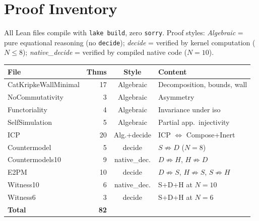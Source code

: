 \documentclass[sigconf,screen,review,anonymous]{acmart}
\begin{document}
\section{Proof Inventory}
\label{app:inventory}

All Lean files compile with \texttt{lake build}, zero \texttt{sorry}. Proof styles: \emph{Algebraic} = pure equational reasoning (no \texttt{decide}); \emph{decide} = verified by kernel computation ($N \leq 8$); \emph{native\_decide} = verified by compiled native code ($N = 10$).

\medskip
{\small
\begin{tabular}{lrcl}
\textbf{File} & \textbf{Thms} & \textbf{Style} & \textbf{Content} \\
\hline
CatKripkeWallMinimal & 17 & Algebraic & Decomposition, bounds, wall \\
NoCommutativity      &  3 & Algebraic & Asymmetry \\
Functoriality        &  4 & Algebraic & Invariance under iso \\
SelfSimulation       &  5 & Algebraic & Partial app.\ injectivity \\
ICP                  & 20 & Alg.+decide & ICP $\Leftrightarrow$ Compose+Inert \\
Countermodel         &  5 & decide & $S \not\Rightarrow D$ ($N\!=\!8$) \\
Countermodels10      &  9 & native\_dec. & $D \not\Rightarrow H$, $H \not\Rightarrow D$ \\
E2PM                 & 10 & decide & $D \not\Rightarrow S$, $H \not\Rightarrow S$, $S \not\Rightarrow H$ \\
Witness10            &  6 & native\_dec. & S+D+H at $N\!=\!10$ \\
Witness6             &  3 & decide & S+D+H at $N\!=\!6$ \\
\hline
\textbf{Total}       & \textbf{82} & & \\
\end{tabular}}
\end{document}
